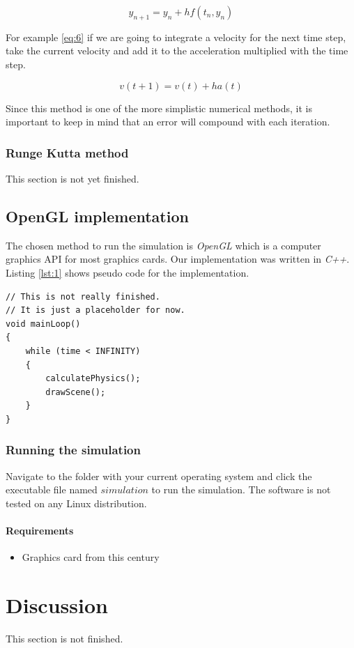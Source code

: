 \documentclass[a4paper,12pt]{report}
\begin{document}
\begin{equation}
y_{n+1}=y_{n}+hf(t_n, y_n)
\label{eq:5}
\end{equation}

For example \ref{eq:6} if we are going to integrate a velocity for the next time step, take the current velocity and add it to the acceleration multiplied with the time step.

\begin{equation}
v(t+1)=v(t)+ha(t)
\label{eq:6}
\end{equation}

Since this method is one of the more simplistic numerical methods, it is important to keep in mind that an error will compound with each iteration.

\subsection{Runge Kutta method}

This section is not yet finished.

\section{OpenGL implementation}

The chosen method to run the simulation is \emph{OpenGL} which is a computer graphics API for most graphics cards. Our implementation was written in \emph{C++}. Listing \ref{lst:1} shows pseudo code for the implementation.

\begin{lstlisting}[caption={Pseudo code for the simulation loop.}, label=lst:1]
// This is not really finished.
// It is just a placeholder for now.
void mainLoop()
{
    while (time < INFINITY)
    {
        calculatePhysics();
        drawScene();
    }
}
\end{lstlisting}

\subsection{Running the simulation}
Navigate to the folder with your current operating system and click the executable file named $simulation$ to run the simulation. The software is not tested on any Linux distribution.

\subsubsection{Requirements}
\begin{itemize}
    \item Graphics card from this century
\end{itemize}


\chapter{Discussion}

This section is not finished.






\end{document}
